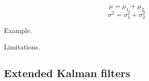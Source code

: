 \begin{equation}
\label{eq:new_mu2}
\mu = \mu_{1} + \mu_{2}
\end{equation}
\begin{equation}
\label{eq:new_sigma2}
\sigma^2 = \sigma_{1}^2 + \sigma_{2}^2
\end{equation}

Example.


Limitations.

\subsection{Extended Kalman filters}



